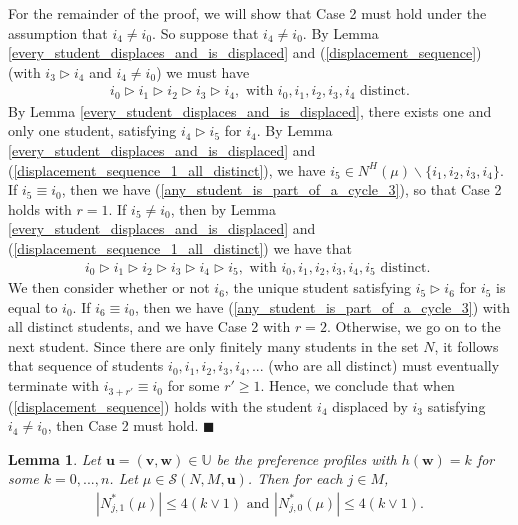 \documentclass[12pt, fullpage]{amsart}
\newtheorem{lemma}{Lemma}[section]
\theoremstyle{definition}
\theoremstyle{definition}
\theoremstyle{definition}
\begin{document}
\begin{bibunit}[econometrica]
For the remainder of the proof, we will show that Case 2 must hold under the assumption that $i_{4}\ne i_{0}$. So suppose that $i_{4}\ne i_{0}$. By Lemma \ref{every_student_displaces_and_is_displaced} and (\ref{displacement_sequence})  (with $i_{3}\vartriangleright i_{4}$ and $i_{4}\ne i_{0}$) we must have 
		\begin{align}\label{displacement_sequence_1_all_distinct}
	i_{0}\vartriangleright i_{1}\vartriangleright i_{2}\vartriangleright i_{3}\vartriangleright i_{4}, \text{ with }i_{0},i_{1},i_{2},i_{3},i_{4}\text{ distinct.}
\end{align}
 By  Lemma \ref{every_student_displaces_and_is_displaced}, there exists one and only one student, satisfying $i_{4}\vartriangleright i_{5}$ for $i_{4}$. By Lemma \ref{every_student_displaces_and_is_displaced} and   (\ref{displacement_sequence_1_all_distinct}), we have $i_{5}\in N^{H}(\mu) \backslash \{i_{1},i_{2},i_{3},i_{4}\}$. If $i_{5}\equiv i_{0}$, then we have (\ref{any_student_is_part_of_a_cycle_3}), so that Case 2 holds with $r=1$.  If $i_{5}\ne i_{0}$, then by Lemma \ref{every_student_displaces_and_is_displaced} and (\ref{displacement_sequence_1_all_distinct}) we have that 
\begin{align}\label{displacement_sequence_2_all_distinct}
	i_{0}\vartriangleright i_{1}\vartriangleright i_{2}\vartriangleright i_{3}\vartriangleright i_{4}\vartriangleright i_{5}, \text{ with }i_{0},i_{1},i_{2},i_{3},i_{4},i_{5} \text{ distinct. } 
\end{align}
 We then consider whether or not $i_{6}$, the unique student satisfying $i_{5}\vartriangleright i_{6}$ for $i_{5}$ is equal to $i_{0}$. If $i_{6}\equiv i_{0}$, then we have (\ref{any_student_is_part_of_a_cycle_3}) with all distinct students, and we have Case 2 with $r=2$. Otherwise, we go on to the next student. Since there are only finitely many students in the set $N$, it follows that sequence of students $i_{0},i_{1},i_{2},i_{3},i_{4},...$ (who are all distinct) must eventually terminate with $i_{3+r'}\equiv i_{0}$ for some $r'\geq 1$. Hence, we conclude that when (\ref{displacement_sequence}) holds with the student $i_{4}$ displaced by $i_{3}$ satisfying $i_{4}\ne i_{0}$, then Case 2 must hold. $\blacksquare$

\begin{lemma}\label{lemm:bounded_between_two_stable_preliminary} Let $\boldsymbol{u} = (\boldsymbol{v},\boldsymbol{w}) \in\mathbb{U}$ be the preference profiles with $h(\boldsymbol{w}) =k$ for some $k =0,...,n$. Let $\mu \in  \mathcal{S}(N,M,\boldsymbol{u})$. Then for each $j\in M$,
	\begin{align}\label{eq:bounded_between_two_stable_preliminary_equation}
		|N^{*}_{j,1}(\mu)|\leq 4(k\vee 1)\text{  and }  	|N^{*}_{j,0}(\mu)|\leq 4(k \vee 1).
	\end{align}
\end{lemma}


\end{bibunit}
\end{document}
